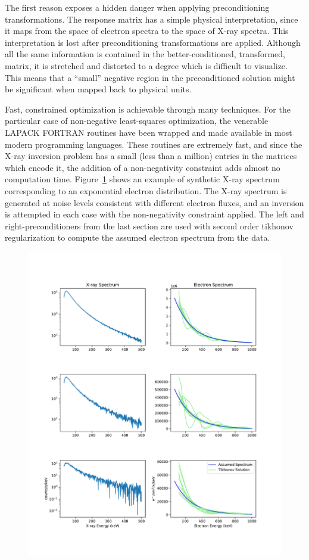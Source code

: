 The first reason exposes a hidden danger when applying preconditioning transformations. The response matrix has a simple physical interpretation, since it maps from the space of electron spectra to the space of X-ray spectra. This interpretation is lost after preconditioning transformations are applied. Although all the same information is contained in the better-conditioned, transformed, matrix, it is stretched and distorted to a degree which is difficult to visualize. This means that a ``small'' negative region in the preconditioned solution might be significant when mapped back to physical units. 

Fast, constrained optimization is achievable through many techniques. For the particular case of non-negative least-squares optimization, the venerable LAPACK FORTRAN routines have been wrapped and made available in most modern programming languages. These routines are extremely fast, and since the X-ray inversion problem has a small (less than a million) entries in the matrices which encode it, the addition of a non-negativity constraint adds almost no computation time. 
Figure~\ref{why_non_negative_is_good} shows an example of synthetic X-ray spectrum corresponding to an exponential electron distribution. The X-ray spectrum is generated at noise levels consistent with different electron fluxes, and an inversion is attempted in each case with the non-negativity constraint applied. The left and right-preconditioners from the last section are used with second order tikhonov regularization to compute the assumed electron spectrum from the data. 

\begin{figure}[p]
    \centering
    \includegraphics[width=1.3\textwidth]{figures/chapter_4/why_non_negative_is_good/fig.pdf}
    \caption{}
    \label{why_non_negative_is_good}
\end{figure}